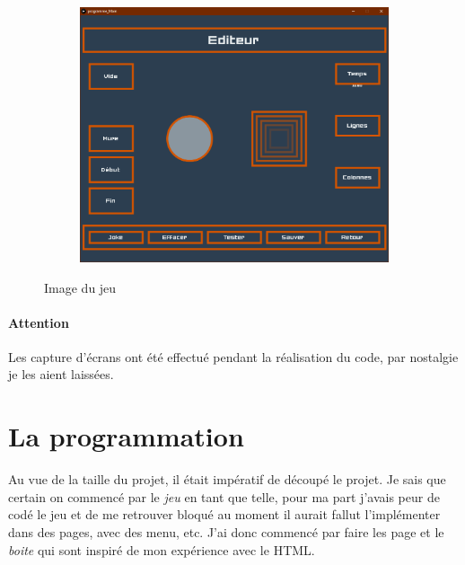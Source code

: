 \documentclass[10pt,a4paper]{article}
\begin{document}
\begin{figure}[h!]
\begin{subfigure}{.24\textwidth}
\end{subfigure} 
\begin{subfigure}{.24\textwidth}
	\centering
	\includegraphics[width=.9\linewidth]{Capture4.PNG}
\end{subfigure}
\label{fig10}
\caption{Image du jeu}
\end{figure}
\paragraph{Attention}Les capture d'écrans ont été effectué pendant la réalisation du code, par nostalgie je les aient laissées. 
\section{La programmation}
Au vue de la taille du projet, il était impératif de découpé le projet. Je sais que certain on commencé par le \textit{jeu} en tant que telle, pour ma part j'avais peur de codé le jeu et de me retrouver bloqué au moment il aurait fallut l'implémenter dans des pages, avec des menu, etc. J'ai donc commencé par faire les page et le \textit{boite} qui sont inspiré de mon expérience avec le HTML. 
\end{document}
